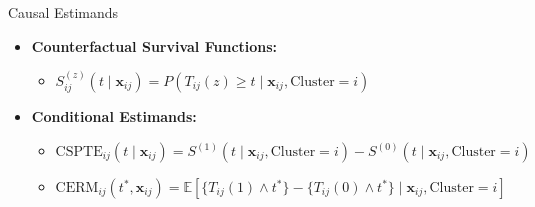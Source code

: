 \documentclass{beamer}
\begin{document}
\begin{frame}{Causal Estimands}
\begin{itemize}
  \vfill \item \textbf{Counterfactual Survival Functions:}
\begin{itemize}
    \vfill \item \( S^{(z)}_{ij}(t \mid   \mathbf{x}_{ij}) = P(T_{ij}(z) \geq t \mid   \mathbf{x}_{ij}, \text{Cluster}=i) \)
  \end{itemize}
  \vspace{6pt}
  \vfill \item \textbf{Conditional Estimands:}
  \begin{itemize}
   \vfill \item ${\text{CSPTE}}_{ij}(t \mid   \mathbf{x}_{ij} ) = S^{(1)}(t \mid   \mathbf{x}_{ij}, \text{Cluster}=i) - S^{(0)}(t \mid   \mathbf{x}_{ij}, \text{Cluster}=i)$
    
    \vfill \item $\text{CERM}_{ij}(t^*, \mathbf{x}_{ij}) = \mathbb{E}[\{T_{ij}(1) \wedge t^*\} - \{T_{ij}(0) \wedge t^*\} \mid   \mathbf{x}_{ij}, \text{Cluster}=i]$
    \end{itemize}
\end{itemize}
\end{frame}

\end{document}
